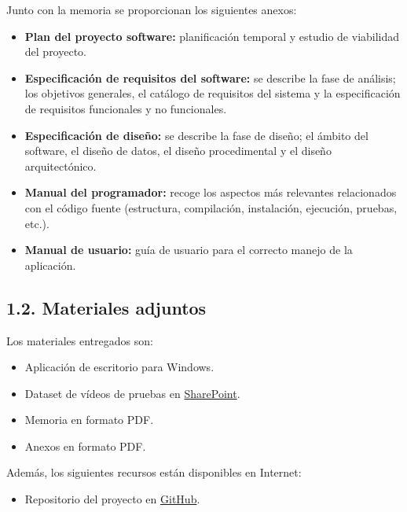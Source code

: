 Junto con la memoria se proporcionan los siguientes anexos:
\begin{itemize}
	\item \textbf{Plan del proyecto software:} planificación temporal y estudio de viabilidad del proyecto.
	\item \textbf{Especificación de requisitos del software:} se describe la fase de análisis; los objetivos generales, el catálogo de requisitos del sistema y la especificación de requisitos funcionales y no funcionales.
	\item \textbf{Especificación de diseño:} se describe la fase de diseño; el ámbito
del software, el diseño de datos, el diseño procedimental y el diseño arquitectónico.
	\item \textbf{Manual del programador:} recoge los aspectos más relevantes relacionados
con el código fuente (estructura, compilación, instalación, ejecución, pruebas, etc.).
	\item \textbf{Manual de usuario:} guía de usuario para el correcto manejo de la
aplicación.
\end{itemize}


\subsection{1.2. Materiales adjuntos}

Los materiales entregados son:
\begin{itemize}
	\item Aplicación de escritorio para Windows.
	\item Dataset de vídeos de pruebas en \href{https://universidaddeburgos-my.sharepoint.com/:f:/g/personal/fcd0011_alu_ubu_es/Eg5qesyMSXpKlnX3wkOL3XoBlN698BzMifS3JDt8MnxFCg?e=zYnkvR}{SharePoint}.
	\item Memoria en formato PDF.
	\item Anexos en formato PDF.
\end{itemize}

Además, los siguientes recursos están disponibles en Internet:
\begin{itemize}
	\item Repositorio del proyecto en \href{https://github.com/FranBurgos/TFG}{GitHub}.
\end{itemize}